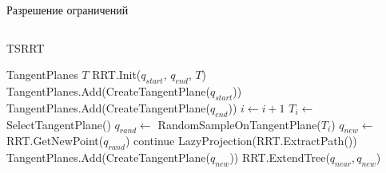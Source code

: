 \documentclass[11pt, aspectratio=169]{beamer}
\begin{document}
\begin{frame}{Разрешение ограничений}
\begin{columns}[onlytextwidth]
\begin{column}{0.58\textwidth}
\begin{algorithm}[H]
                \caption{TSRRT}\label{alg:TSRRT}
                \begin{algorithmic}[1]
                    \State TangentPlanes $T$
                    \State RRT.Init($q_{start}$, $q_{end}$, $T$)
                    \State TangentPlanes.Add(CreateTangentPlane($q_{start}$))
                    \State TangentPlanes.Add(CreateTangentPlane($q_{end}$))
                        \State $i \gets i + 1$
                        \State $T_i \gets $ SelectTangentPlane()
                        \State $q_{rand} \gets$ RandomSampleOnTangentPlane($T_i$)
                        \State $q_{new}\gets$ RRT.GetNewPoint($q_{rand}$)
                            continue
                        \EndIIf
                            \State \Return LazyProjection(RRT.ExtractPath())
                        \EndIf
                            \State TangentPlanes.Add(CreateTangentPlane($q_{new}$))
                        \EndIf
                        \State RRT.ExtendTree($q_{near}, q_{new}$)
                    \EndWhile
                \end{algorithmic}
            \end{algorithm}
        \end{column}
    \end{columns}
\end{frame}
\end{document}
